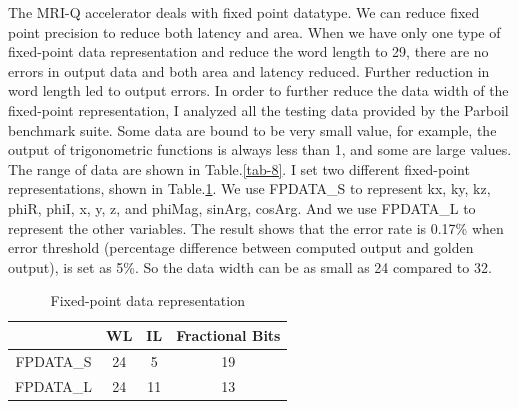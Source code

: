 The MRI-Q accelerator deals with fixed point datatype. We can reduce fixed point
precision to reduce both latency and area. When we have only one type of
fixed-point data representation and reduce the word length to 29, there are no
errors in output data and both area and latency reduced. Further reduction in
word length led to output errors. In order to further reduce the data width of
the fixed-point representation, I analyzed all the testing data provided by the
Parboil benchmark suite. Some data are bound to be very small value, for
example, the output of trigonometric functions is always less than 1, and some
are large values. The range of data are shown in Table.\ref{tab-8}. I set two
different fixed-point representations, shown in Table.\ref{tab-4}. We use
FPDATA\_S to represent kx, ky, kz, phiR, phiI, x, y, z, and phiMag, sinArg,
cosArg. And we use FPDATA\_L to represent the other variables. The result shows
that the error rate is 0.17\% when error threshold (percentage difference
between computed output and golden output), is set as 5\%. So the data width can
be as small as 24 compared to 32. \\

\begin{table}[h!]
    \centering
    \begin{tabular}{c|c|c|c}
    \hline
        & WL & IL & Fractional Bits \\
        \hline
   FPDATA\_S &  24  & 5  & 19 \\ 
FPDATA\_L &  24 & 11   & 13\\
    \hline
    \end{tabular}
    \caption{Fixed-point data representation}
    \label{tab-4}
\end{table}

